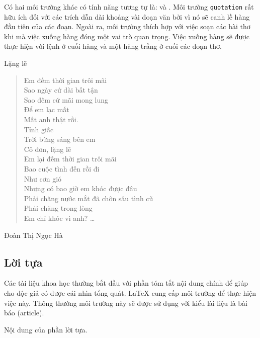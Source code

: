 Có hai môi trường khác có tính năng tương tự là:  và . Môi trường \texttt{quotation} rất hữu ích đối với các trích dẫn dài khoảng vài đoạn văn bởi vì nó sẽ canh lề hàng đầu tiên của các đoạn. Ngoài ra, môi trường  thích hợp với việc soạn các bài thơ khi mà việc xuống hàng đóng một vai trò quan trọng. Việc xuống hàng sẽ được thực hiện với lệnh \ci{\bs} ở cuối hàng và một hàng trắng ở cuối các đoạn thơ.
\begin{example}
Lặng lẽ
\begin{flushleft}
\begin{verse}
Em đếm thời gian trôi mãi\\
Sao ngày cứ dài bất tận\\
Sao đêm cứ mãi
mong lung\\
Để em lạc mất\\
Mất anh thật rồi.\\

Tỉnh giấc\\
Trời bừng sáng bên em\\
Cô đơn, lặng lẽ\\
Em lại đếm
thời gian trôi mãi\\
Bao cuộc tình đến rồi đi\\
Như cơn gió\\
Nhưng có bao giờ em khóc được đâu\\
Phải chăng nước mắt đã chôn
sâu tình cũ\\
Phải chăng trong lòng\\
Em chỉ khóc vì anh? \ldots
\end{verse}
\end{flushleft}
\begin{flushright}
    Đoàn Thị Ngọc Hà
\end{flushright}
\end{example}

\subsection{Lời tựa}
Các tài liệu khoa học thường bắt đầu với phần tóm tắt nội dung chính để giúp cho độc giả có được cái nhìn tổng quát. \LaTeX{} cung cấp môi trường  để thực hiện việc này. Thông thường môi trường này sẽ được sử dụng với kiểu lài liệu là bài báo (article).

\newenvironment{abstract}%
        {\begin{center}\begin{small}\begin{minipage}{0.8\textwidth}}%
        {\end{minipage}\end{small}\end{center}}
\begin{example}
\begin{abstract}
Nội dung của phần lời tựa.
\end{abstract}
\end{example}

